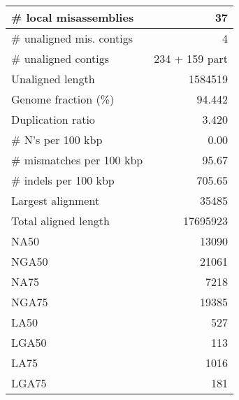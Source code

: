 \documentclass[12pt,a4paper]{article}
\begin{document}
\begin{table}[ht]
\begin{center}
\begin{tabular}{|l*{1}{|r}|}
\# local misassemblies & 37 \\ \hline
\# unaligned mis. contigs & 4 \\ \hline
\# unaligned contigs & 234 + 159 part \\ \hline
Unaligned length & 1584519 \\ \hline
Genome fraction (\%) & 94.442 \\ \hline
Duplication ratio & 3.420 \\ \hline
\# N's per 100 kbp & 0.00 \\ \hline
\# mismatches per 100 kbp & 95.67 \\ \hline
\# indels per 100 kbp & 705.65 \\ \hline
Largest alignment & 35485 \\ \hline
Total aligned length & 17695923 \\ \hline
NA50 & 13090 \\ \hline
NGA50 & 21061 \\ \hline
NA75 & 7218 \\ \hline
NGA75 & 19385 \\ \hline
LA50 & 527 \\ \hline
LGA50 & 113 \\ \hline
LA75 & 1016 \\ \hline
LGA75 & 181 \\ \hline
\end{tabular}
\end{center}
\end{table}
\end{document}
